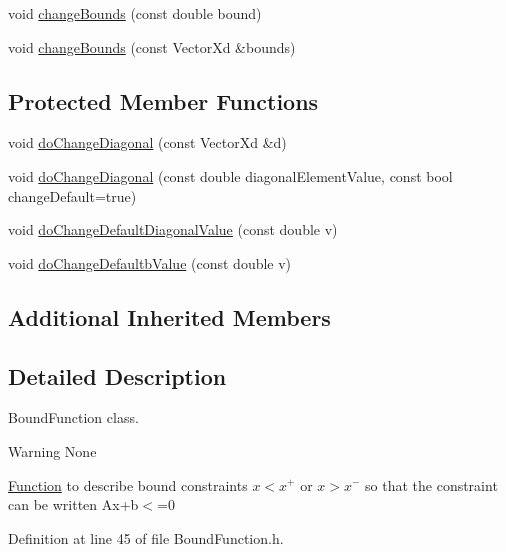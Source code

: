 {\bf }\par
\begin{DoxyCompactItemize}
\item 
void \hyperlink{classocra_1_1BoundFunction_a205a73bb12f3255368d125ba0a6b4e58}{change\+Bounds} (const double bound)
\item 
void \hyperlink{classocra_1_1BoundFunction_aa69f4a52a46914e6ecbffb525e7d1314}{change\+Bounds} (const Vector\+Xd \&bounds)
\end{DoxyCompactItemize}

\subsection*{Protected Member Functions}
{\bf }\par
\begin{DoxyCompactItemize}
\item 
void \hyperlink{classocra_1_1BoundFunction_a95e8e97598f5ca779b9c171c56a7342a}{do\+Change\+Diagonal} (const Vector\+Xd \&d)
\item 
void \hyperlink{classocra_1_1BoundFunction_ac1a1b78b8b1796543b4c83ae5d8de755}{do\+Change\+Diagonal} (const double diagonal\+Element\+Value, const bool change\+Default=true)
\item 
void \hyperlink{classocra_1_1BoundFunction_af02c8fc499fb37596c758861d98cfbf6}{do\+Change\+Default\+Diagonal\+Value} (const double v)
\item 
void \hyperlink{classocra_1_1BoundFunction_aa861028f4a37e45b4fc68b7852d7e451}{do\+Change\+Defaultb\+Value} (const double v)
\end{DoxyCompactItemize}

\subsection*{Additional Inherited Members}


\subsection{Detailed Description}
Bound\+Function class. 

\begin{DoxyWarning}{Warning}
None
\end{DoxyWarning}
\hyperlink{classocra_1_1Function}{Function} to describe bound constraints $ x<x^+ $ or $ x>x^- $ so that the constraint can be written Ax+b$<$=0 

Definition at line 45 of file Bound\+Function.\+h.



